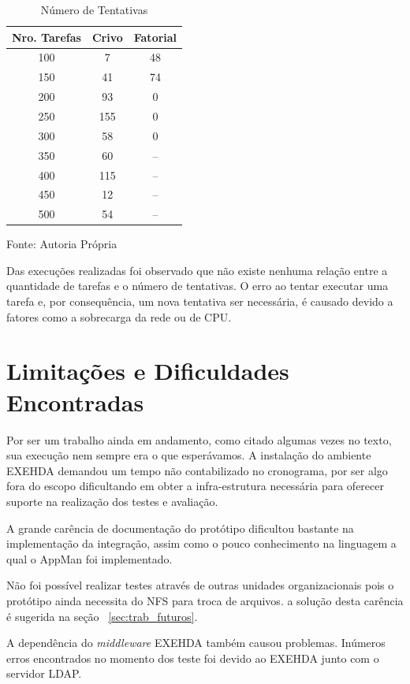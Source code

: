 \begin{table}[hbtp]
\begin{center}
\caption{Número de Tentativas}
\label{tab:tentativas}
\begin{tabular}{c|c|c}
	\hline
		{\bf Nro. Tarefas } & {\bf Crivo } & {\bf Fatorial }\\
	\hline
	100 & 7 & 48\\ \hline
	150 & 41 & 74\\ \hline
	200 & 93 & 0\\ \hline
	250 & 155 & 0\\ \hline
	300 & 58 & 0\\ \hline
	350 & 60 & --\\ \hline
	400 & 115 & --\\ \hline
	450 & 12 & --\\ \hline
	500 & 54 & --\\ \hline
\end{tabular}
\end{center}
\begin{center}
Fonte: Autoria Própria
\end{center}
\end{table}

Das execuções realizadas foi observado que não existe nenhuma relação entre a quantidade de tarefas e o número de tentativas. O erro ao tentar executar uma tarefa e, por consequência, um nova tentativa ser necessária, é causado devido a fatores como a sobrecarga da rede ou de CPU.

\pagebreak

\section{Limitações e Dificuldades Encontradas}

Por ser um trabalho ainda em andamento, como citado algumas vezes no texto, sua execução nem sempre era o que esperávamos. A instalação do ambiente EXEHDA demandou um tempo não contabilizado no cronograma, por ser algo fora do escopo dificultando em obter a infra-estrutura necessária para oferecer suporte na realização dos testes e avaliação. 

A grande carência de documentação do protótipo dificultou bastante na implementação da integração, assim como o pouco conhecimento na linguagem a qual o AppMan foi implementado.

Não foi possível realizar testes através de outras unidades organizacionais pois o protótipo ainda necessita do NFS para troca de arquivos. a solução desta carência é sugerida na seção ~\ref{sec:trab_futuros}.

A dependência do \emph{middleware} EXEHDA também causou problemas. Inúmeros erros encontrados no momento dos teste foi devido ao EXEHDA junto com o servidor LDAP.
